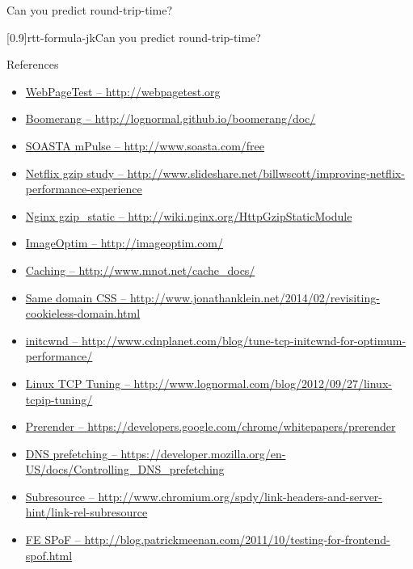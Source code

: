 \documentclass{beamer}
\newcommand{\splashimagev}[4][1]{
  \setbeamertemplate{background}{
    \parbox[c][0.95\paperheight]{{#1}\paperwidth}{
      \vfill \hfill \pgfimage[height=0.86\paperheight]{#2}
    }
  }
  \begin{frame}{#3}
    \parbox[r][0.75\paperheight]{0.9\paperwidth}{
      \vfill {#4}
    }
  \end{frame}
  \setbeamertemplate{background}{}
}
\begin{document}
\splashimagev[0.9]{rtt-formula}{Can you predict round-trip-time?}

\splashimagev[0.9]{rtt-formula-jk}{Can you predict round-trip-time?}

\begin{frame}{References}
\begin{itemize}
  \item \tiny \href{http://webpagetest.org}{WebPageTest -- http://webpagetest.org}
  \item \tiny \href{http://lognormal.github.io/boomerang/doc/}{Boomerang -- http://lognormal.github.io/boomerang/doc/}
  \item \tiny \href{http://www.soasta.com/free}{SOASTA mPulse -- http://www.soasta.com/free}
  \item \tiny \href{http://www.slideshare.net/billwscott/improving-netflix-performance-experience}{Netflix gzip study -- http://www.slideshare.net/billwscott/improving-netflix-performance-experience}
  \item \tiny \href{http://wiki.nginx.org/HttpGzipStaticModule}{Nginx gzip\_static -- http://wiki.nginx.org/HttpGzipStaticModule}
  \item \tiny \href{http://imageoptim.com/}{ImageOptim -- http://imageoptim.com/}
  \item \tiny \href{http://www.mnot.net/cache_docs/}{Caching -- http://www.mnot.net/cache\_docs/}
  \item \tiny \href{http://www.jonathanklein.net/2014/02/revisiting-cookieless-domain.html}{Same domain CSS -- http://www.jonathanklein.net/2014/02/revisiting-cookieless-domain.html}
  \item \tiny \href{http://www.cdnplanet.com/blog/tune-tcp-initcwnd-for-optimum-performance/}{initcwnd -- http://www.cdnplanet.com/blog/tune-tcp-initcwnd-for-optimum-performance/}
  \item \tiny \href{http://www.lognormal.com/blog/2012/09/27/linux-tcpip-tuning/}{Linux TCP Tuning -- http://www.lognormal.com/blog/2012/09/27/linux-tcpip-tuning/}
  \item \tiny \href{https://developers.google.com/chrome/whitepapers/prerender}{Prerender -- https://developers.google.com/chrome/whitepapers/prerender}
  \item \tiny \href{https://developer.mozilla.org/en-US/docs/Controlling_DNS_prefetching}{DNS prefetching -- https://developer.mozilla.org/en-US/docs/Controlling\_DNS\_prefetching}
  \item \tiny \href{http://www.chromium.org/spdy/link-headers-and-server-hint/link-rel-subresource}{Subresource -- http://www.chromium.org/spdy/link-headers-and-server-hint/link-rel-subresource}
  \item \tiny \href{http://blog.patrickmeenan.com/2011/10/testing-for-frontend-spof.html}{FE SPoF -- http://blog.patrickmeenan.com/2011/10/testing-for-frontend-spof.html}
\end{itemize}
\end{frame}
\end{document}
